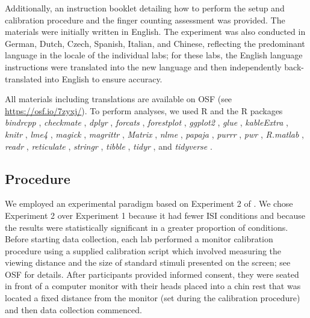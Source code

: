 \documentclass[A4paper,man,floatsintext]{apa6}
\theoremstyle{definition}
\theoremstyle{definition}
\theoremstyle{definition}
\theoremstyle{remark}
\begin{document}
Additionally, an instruction booklet detailing how to perform the setup
and calibration procedure and the finger counting assessment was
provided. The materials were initially written in English. The
experiment was also conducted in German, Dutch, Czech, Spanish, Italian,
and Chinese, reflecting the predominant language in the locale of the
individual labs; for these labs, the English language instructions were
translated into the new language and then independently back-translated
into English to ensure accuracy.

All materials including translations are available on OSF (see
\url{https://osf.io/7zyxj/}). To perform analyses, we used R
\autocite[Version 3.5.1;][]{R-base} and the R packages \emph{bindrcpp}
\autocite[Version 0.2.2;][]{R-bindrcpp}, \emph{checkmate}
\autocite[Version 1.8.5;][]{R-checkmate}, \emph{dplyr} \autocite[Version
0.7.6;][]{R-dplyr}, \emph{forcats} \autocite[Version
0.3.0;][]{R-forcats}, \emph{forestplot} \autocite[Version
1.7.2;][]{R-forestplot}, \emph{ggplot2} \autocite[Version
3.0.0;][]{R-ggplot2}, \emph{glue} \autocite[Version 1.3.0;][]{R-glue},
\emph{kableExtra} \autocite[Version 0.9.0;][]{R-kableExtra},
\emph{knitr} \autocite[Version 1.20;][]{R-knitr}, \emph{lme4}
\autocite[Version 1.1.18.1;][]{R-lme4}, \emph{magick} \autocite[Version
1.9;][]{R-magick}, \emph{magrittr} \autocite[Version
1.5;][]{R-magrittr}, \emph{Matrix} \autocite[Version
1.2.14;][]{R-Matrix}, \emph{nlme} \autocite[Version 3.1.137;][]{R-nlme},
\emph{papaja} \autocite[Version 0.1.0.9842;][]{R-papaja}, \emph{purrr}
\autocite[Version 0.2.5;][]{R-purrr}, \emph{pwr} \autocite[Version
1.2.2;][]{R-pwr}, \emph{R.matlab} \autocite[Version
3.6.2;][]{R-R.matlab}, \emph{readr} \autocite[Version
1.1.1;][]{R-readr}, \emph{reticulate} \autocite[Version
1.10;][]{R-reticulate}, \emph{stringr} \autocite[Version
1.3.1;][]{R-stringr}, \emph{tibble} \autocite[Version
1.4.2;][]{R-tibble}, \emph{tidyr} \autocite[Version 0.8.1;][]{R-tidyr},
and \emph{tidyverse} \autocite[Version 1.2.1;][]{R-tidyverse}.

\subsection{Procedure}\label{procedure}

We employed an experimental paradigm based on Experiment 2 of
\textcite{Fischer:2003ju}. We chose Experiment 2 over Experiment 1
because it had fewer ISI conditions and because the results were
statistically significant in a greater proportion of conditions. Before
starting data collection, each lab performed a monitor calibration
procedure using a supplied calibration script which involved measuring
the viewing distance and the size of standard stimuli presented on the
screen; see OSF for details. After participants provided informed
consent, they were seated in front of a computer monitor with their
heads placed into a chin rest that was located a fixed distance from the
monitor (set during the calibration procedure) and then data collection
commenced.
\end{document}

